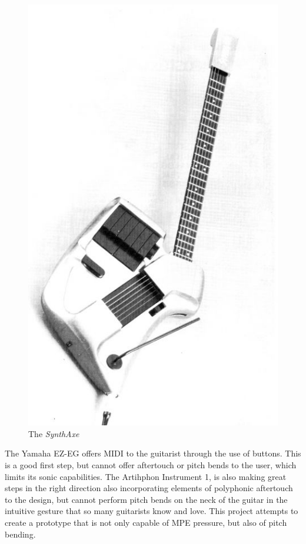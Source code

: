 \begin{figure}[h]
    \centering
    \includegraphics[scale=0.5]{Images/synthaxe.jpg}
    \caption{The \textit{SynthAxe}}
    \label{fig:synthaxe}
\end{figure}

The Yamaha EZ-EG \citep{yamaha_yamaha_2003} offers MIDI to the guitarist through the use of buttons. This is a good first step, but cannot offer aftertouch or pitch bends to the user, which limits its sonic capabilities. The Artihphon Instrument 1, is also making great steps in the right direction also incorporating elements of polyphonic aftertouch to the design, but cannot perform pitch bends on the neck of the guitar in the intuitive gesture that so many guitarists know and love. This project attempts to create a prototype that is not only capable of MPE pressure, but also of pitch bending. 



